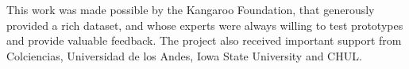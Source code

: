 \documentclass[twocolumn]{svjour3}
\begin{document}
\begin{acknowledgements}

This work was made possible by the Kangaroo Foundation, that generously provided a rich dataset, and whose experts were always willing to test prototypes and provide valuable feedback. The project also received important support from Colciencias, Universidad de los Andes, Iowa State University and CHUL.

\end{acknowledgements}

 

\end{document}

